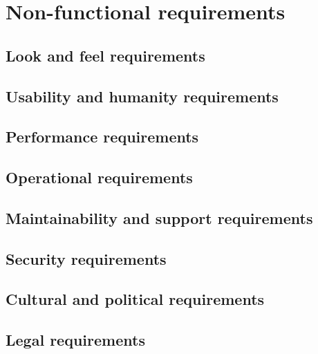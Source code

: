 \chapter{Non-functional requirements}

\section{Look and feel requirements}

\section{Usability and humanity requirements}

\section{Performance requirements}

\section{Operational requirements}

\section{Maintainability and support requirements}

\section{Security requirements}

\section{Cultural and political requirements}

\section{Legal requirements}